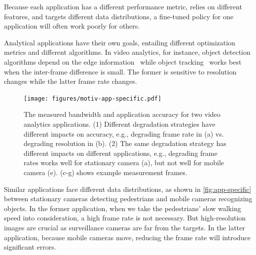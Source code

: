  Because each application
has a different performance metric, relies on different features, and targets
different data distributions, a fine-tuned policy for one application will often
work poorly for others.

Analytical applications have their own goals, entailing different optimization
metrics and different algorithms. In video analytics, for instance, object
detection algorithms depend on the edge
information~\cite{canny1986computational, lowe2004distinctive, viola2001rapid}
while object tracking~\cite{allen2004object} works best when the inter-frame
difference is small. The former is sensitive to resolution changes while the
latter frame rate changes.

\begin{figure}
  \centering
  \texttt{[image: figures/motiv-app-specific.pdf]}
  \caption{The measured bandwidth and application accuracy for two video
    analytics applications.  (1) Different degradation strategies have different
    impacts on accuracy, e.g., degrading frame rate in (a) vs.\,degrading
    resolution in (b).  (2) The same degradation strategy has different impacts
    on different applications, e.g., degrading frame rates works well for
    stationary camera (a), but not well for mobile camera (e). (c-g) shows
    example measurement frames.}
  \label{fig:app-specific}
\end{figure}

Similar applications face different data distributions, as shown in
\autoref{fig:app-specific} between stationary cameras detecting pedestrians and
mobile cameras recognizing objects. In the former application, when we take the
pedestrians' slow walking speed into consideration, a high frame rate is not
necessary. But high-resolution images are crucial as surveillance cameras are
far from the targets. In the latter application, because mobile cameras move,
reducing the frame rate will introduce significant errors.

